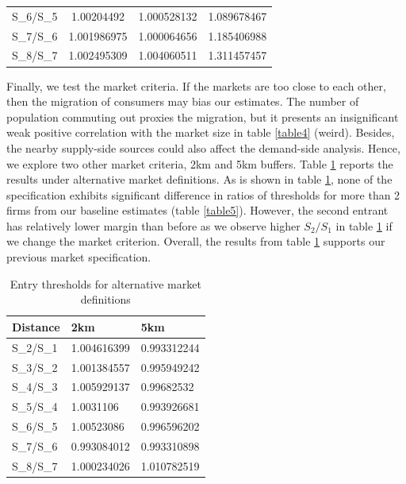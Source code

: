 \documentclass[a4paper,11pt]{article}
\begin{document}
\begin{table}[htbp]
{\begin{tabular}{cccc}
S\_6/S\_5                 & 1.00204492  & 1.000528132                                     & 1.089678467                                                                                                                                                                     \\
S\_7/S\_6                 & 1.001986975 & 1.000064656                                     & 1.185406988                                                                                                                                                                     \\
S\_8/S\_7                 & 1.002495309 & 1.004060511                                     & 1.311457457  \\ \bottomrule                                                                    
\end{tabular}}
\end{table}

Finally, we test the market criteria. If the markets are too close to each other, then the migration of consumers may bias our estimates. The number of population commuting out proxies the migration, but it presents an insignificant weak positive correlation with the market size in table \ref{table4} (weird). Besides, the nearby supply-side sources could also affect the demand-side analysis. Hence, we explore two other market criteria, 2km and 5km buffers. Table \ref{table9} reports the results under alternative market definitions. As is shown in table \ref{table9}, none of the specification exhibits significant difference in ratios of thresholds for more than 2 firms from our baseline estimates (table \ref{table5}).  However, the second entrant has relatively lower margin than before as we observe higher $S_2/S_1$ in table \ref{table9} if we change the market criterion. Overall, the results from table \ref{table9} supports our previous market specification. 

\begin{table}[ht]
\centering
\caption{Entry thresholds for alternative market definitions}
\label{table9}
\begin{tabular}{@{}lll@{}}
\toprule
Distance & 2km         & 5km         \\ \midrule
S\_2/S\_1    & 1.004616399 & 0.993312244 \\
S\_3/S\_2    & 1.001384557 & 0.995949242 \\
S\_4/S\_3    & 1.005929137 & 0.99682532  \\
S\_5/S\_4    & 1.0031106   & 0.993926681 \\
S\_6/S\_5    & 1.00523086  & 0.996596202 \\
S\_7/S\_6    & 0.993084012 & 0.993310898 \\
S\_8/S\_7    & 1.000234026 & 1.010782519 \\ \bottomrule
\end{tabular}
\end{table}
\end{document}
